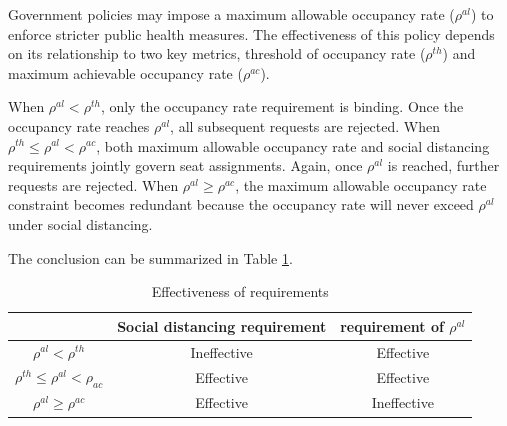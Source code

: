 Government policies may impose a maximum allowable occupancy rate ($\rho^{al}$) to enforce stricter public health measures. The effectiveness of this policy depends on its relationship to two key metrics, threshold of occupancy rate ($\rho^{th}$) and maximum achievable occupancy rate ($\rho^{ac}$).

When $\rho^{al} < \rho^{th}$, only the occupancy rate requirement is binding. Once the occupancy rate reaches $\rho^{al}$, all subsequent requests are rejected. When $\rho^{th} \leq \rho^{al} < \rho^{ac}$, both maximum allowable occupancy rate and social distancing requirements jointly govern seat assignments. Again, once $\rho^{al}$ is reached, further requests are rejected. When $\rho^{al} \geq \rho^{ac}$, the maximum allowable occupancy rate constraint becomes redundant because the occupancy rate will never exceed $\rho^{al}$ under social distancing.


The conclusion can be summarized in Table \ref{tab_requirement}.
\begin{table}[ht]
  \centering
  \caption{Effectiveness of requirements}\label{tab_requirement}
  \begin{tabular}{ccc}
  \hline
  \hline
   & Social distancing requirement & requirement of $\rho^{al}$ \\
  \hline
  $\rho^{al} < \rho^{th}$            & Ineffective & Effective \\
  $\rho^{th} \leq \rho^{al} < \rho_{ac}$  & Effective   & Effective \\
  $\rho^{al} \geq \rho^{ac}$                  & Effective   & Ineffective \\
   \hline
   \hline
  \end{tabular}
\end{table}



